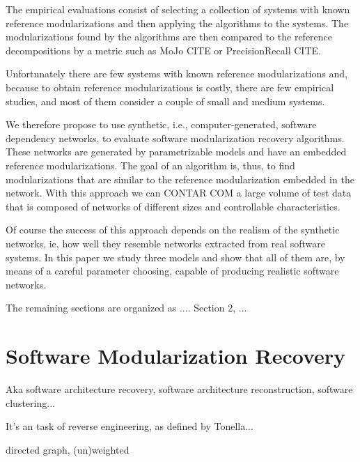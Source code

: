 The empirical evaluations consist of selecting a collection of systems with
known reference modularizations and then applying the algorithms to the systems.
The modularizations found by the algorithms are then compared to the reference
decompositions by a metric such as MoJo CITE or PrecisionRecall CITE.


Unfortunately there are few systems with known reference modularizations and,
because to obtain reference modularizations is costly, there are few empirical
studies, and most of them consider a couple of small and medium systems.

We therefore propose to use synthetic, i.e., computer-generated, software
dependency networks, to evaluate software modularization recovery algorithms.
These networks are generated by parametrizable models and have an embedded
reference modularizations. The goal of an algorithm is, thus, to find
modularizations that are similar to the reference modularization embedded in the
network. With this approach we can CONTAR COM a large volume of test data that
is composed of networks of different sizes and controllable characteristics.

Of course the success of this approach depends on the realism of the synthetic
networks, ie, how well they resemble networks extracted from real software
systems. In this paper we study three models and show that all of them are, by
means of a careful parameter choosing, capable of producing realistic software
networks.

The remaining sections are organized as .... Section 2, ...


\section{Software Modularization Recovery}

Aka software architecture recovery, software architecture reconstruction,
software clustering...

It's an task of reverse engineering, as defined by Tonella...


directed graph, (un)weighted

